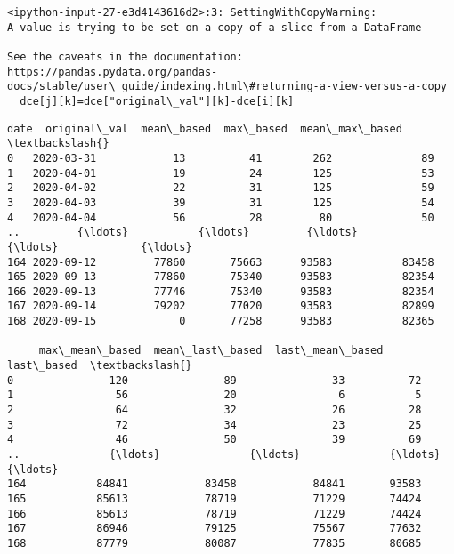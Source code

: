 \documentclass[11pt]{article}
\makeatletter
\newcommand{\boxspacing}{\kern\kvtcb@left@rule\kern\kvtcb@boxsep}
\newcommand{\prompt}[4]{
        \ttfamily\llap{{\color{#2}[#3]:\hspace{3pt}#4}}\vspace{-\baselineskip}
    }
\makeatother
\begin{document}
    \begin{Verbatim}[commandchars=\\\{\}]
<ipython-input-27-e3d4143616d2>:3: SettingWithCopyWarning:
A value is trying to be set on a copy of a slice from a DataFrame

See the caveats in the documentation: https://pandas.pydata.org/pandas-
docs/stable/user\_guide/indexing.html\#returning-a-view-versus-a-copy
  dce[j][k]=dce["original\_val"][k]-dce[i][k]
    \end{Verbatim}

            \begin{tcolorbox}[breakable, size=fbox, boxrule=.5pt, pad at break*=1mm, opacityfill=0]
\prompt{Out}{outcolor}{27}{\boxspacing}
\begin{Verbatim}[commandchars=\\\{\}]
          date  original\_val  mean\_based  max\_based  mean\_max\_based  \textbackslash{}
0   2020-03-31            13          41        262              89
1   2020-04-01            19          24        125              53
2   2020-04-02            22          31        125              59
3   2020-04-03            39          31        125              54
4   2020-04-04            56          28         80              50
..         {\ldots}           {\ldots}         {\ldots}        {\ldots}             {\ldots}
164 2020-09-12         77860       75663      93583           83458
165 2020-09-13         77860       75340      93583           82354
166 2020-09-13         77746       75340      93583           82354
167 2020-09-14         79202       77020      93583           82899
168 2020-09-15             0       77258      93583           82365

     max\_mean\_based  mean\_last\_based  last\_mean\_based  last\_based  \textbackslash{}
0               120               89               33          72
1                56               20                6           5
2                64               32               26          28
3                72               34               23          25
4                46               50               39          69
..              {\ldots}              {\ldots}              {\ldots}         {\ldots}
164           84841            83458            84841       93583
165           85613            78719            71229       74424
166           85613            78719            71229       74424
167           86946            79125            75567       77632
168           87779            80087            77835       80685


\end{Verbatim}
\end{tcolorbox}
\end{document}
